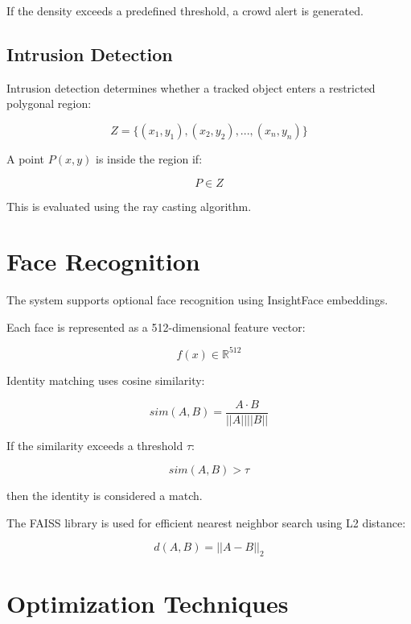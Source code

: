 \documentclass[conference]{IEEEtran}
\begin{document}
If the density exceeds a predefined threshold, a crowd alert is generated.

\subsection{Intrusion Detection}

Intrusion detection determines whether a tracked object enters a restricted polygonal region:

\begin{equation}
Z = \{(x_1,y_1),(x_2,y_2),...,(x_n,y_n)\}
\end{equation}

A point $P(x,y)$ is inside the region if:

\begin{equation}
P \in Z
\end{equation}

This is evaluated using the ray casting algorithm.

\section{Face Recognition}

The system supports optional face recognition using InsightFace embeddings.

Each face is represented as a 512-dimensional feature vector:

\begin{equation}
f(x) \in \mathbb{R}^{512}
\end{equation}

Identity matching uses cosine similarity:

\begin{equation}
sim(A,B) = \frac{A \cdot B}{||A|| ||B||}
\end{equation}

If the similarity exceeds a threshold $\tau$:

\begin{equation}
sim(A,B) > \tau
\end{equation}

then the identity is considered a match.

The FAISS library is used for efficient nearest neighbor search using L2 distance:

\begin{equation}
d(A,B) = ||A-B||_2
\end{equation}

\section{Optimization Techniques}
\end{document}
